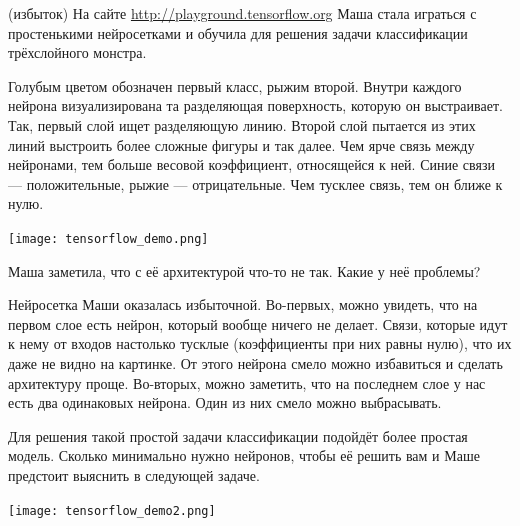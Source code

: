 

\newpage 

\begin{problem}{(избыток)}
На сайте \url{http://playground.tensorflow.org} Маша стала играться с простенькими нейросетками и  обучила для решения задачи классификации трёхслойного монстра. 

Голубым цветом обозначен первый класс, рыжим второй. Внутри каждого нейрона визуализирована та разделяющая поверхность, которую он выстраивает. Так, первый слой ищет разделяющую линию. Второй слой пытается из этих линий выстроить более сложные фигуры и так далее. Чем ярче связь между нейронами, тем больше весовой коэффициент, относящейся к ней. Синие связи --- положительные, рыжие --- отрицательные. Чем тусклее связь, тем он ближе к нулю.

\begin{center} 
\texttt{[image: tensorflow\_demo.png]}
\end{center} 

Маша заметила, что с её архитектурой что-то не так. Какие у неё проблемы?
\end{problem} 

\begin{sol}
Нейросетка Маши оказалась избыточной. Во-первых, можно увидеть, что на первом слое есть нейрон, который вообще ничего не делает. Связи, которые идут к нему от входов настолько тусклые (коэффициенты при них равны нулю), что их даже не видно на картинке. От этого нейрона смело можно избавиться и сделать архитектуру проще.  Во-вторых, можно заметить, что на последнем слое у нас есть два одинаковых нейрона. Один из них смело можно выбрасывать. 

Для решения такой простой задачи классификации подойдёт более простая модель. Сколько минимально нужно нейронов, чтобы её решить вам и Маше предстоит выяснить в следующей задаче. 

\begin{center} 
\texttt{[image: tensorflow\_demo2.png]}
\end{center} 
\end{sol}


